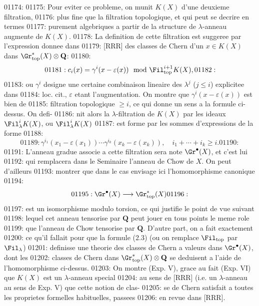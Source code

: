 01174: 
01175: Pour eviter ce probleme, on munit $K(X)$ d'une deuxieme filtration,
01176: plus fine que la filtration topologique, et qui peut se decrire en termes
01177: purement algebriques a partir de la structure de $\lambda$-anneau augmente de $K(X)$.
01178: La definition de cette filtration est suggeree par l'expression donnee dans
01179: [RRR] des classes de Chern d'un $x \in K(X)$ dans $\Gr^*_{\mathrm{top}}(X) \otimes \mathbf{Q}$:
01180: \begin{equation}
01181: c_i(x) = \gamma^i(x - \varepsilon(x)) \mod \Fil^{i+1}_{\mathrm{top}} K(X),
01182: \end{equation}
01183: ou $\gamma^i$ designe une certaine combinaison lineaire des $\lambda^j$ ($j \leq i$) explicitee dans
01184: loc. cit., $\varepsilon$ etant l'augmentation. On montre que $\gamma^i(x - \varepsilon(x))$ est bien de
01185: filtration topologique $\geq i$, ce qui donne un sens a la formule ci-dessus. On defi-
01186: nit alors la $\lambda$-filtration de $K(X)$ par les ideaux $\Fil^i_{\lambda} K(X)$, ou $\Fil^i_{\lambda} K(X)$
01187: est forme par les sommes d'expressions de la forme
01188: \[
01189: \gamma^{i_1}(x_1 - \varepsilon(x_1)) \cdots \gamma^{i_k}(x_k - \varepsilon(x_k)), \quad i_1 + \cdots + i_k \geq i.
01190: \]
01191: L'anneau gradue associe a cette filtration sera note $\Gr^{\bullet}(X)$, et c'est lui
01192: qui remplacera dans le Seminaire l'anneau de Chow de $X$. On peut d'ailleurs
01193: montrer que dans le cas envisage ici l'homomorphisme canonique
01194: \begin{equation}
01195: \Gr^{\bullet}(X) \longrightarrow \Gr^*_{\mathrm{top}}(X)
01196: \end{equation}
01197: est un isomorphisme modulo torsion, ce qui justifie le point de vue suivant
01198: lequel cet anneau tensorise par $\mathbf{Q}$ peut jouer en tous points le meme role
01199: que l'anneau de Chow tensorise par $\mathbf{Q}$. D'autre part, on a fait exactement
01200: ce qu'il fallait pour que la formule (2.3) (ou on remplace $\Fil_{\mathrm{top}}$ par $\Fil_{\lambda}$)
01201: definisse une theorie des classes de Chern a valeurs dans $\Gr^{\bullet}(X)$, dont les
01202: classes de Chern dans $\Gr^*_{\mathrm{top}}(X) \otimes \mathbf{Q}$ se deduisent a l'aide de l'homomorphisme ci-dessus.
01203: On montre (Exp. V), grace au fait (Exp. VI) que $K(X)$ est un $\lambda$-anneau special
01204: au sens de [RRR] (i.e. un $\lambda$-anneau au sens de Exp. V) que cette notion de clas-
01205: se de Chern satisfait a toutes les proprietes formelles habituelles, passees
01206: en revue dans [RRR].
